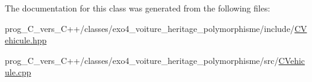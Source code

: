 The documentation for this class was generated from the following files\+:\begin{DoxyCompactItemize}
\item 
prog\+\_\+\+C\+\_\+vers\+\_\+\+C++/classes/exo4\+\_\+voiture\+\_\+heritage\+\_\+polymorphisme/include/\hyperlink{CVehicule_8hpp}{C\+Vehicule.\+hpp}\item 
prog\+\_\+\+C\+\_\+vers\+\_\+\+C++/classes/exo4\+\_\+voiture\+\_\+heritage\+\_\+polymorphisme/src/\hyperlink{CVehicule_8cpp}{C\+Vehicule.\+cpp}\end{DoxyCompactItemize}
